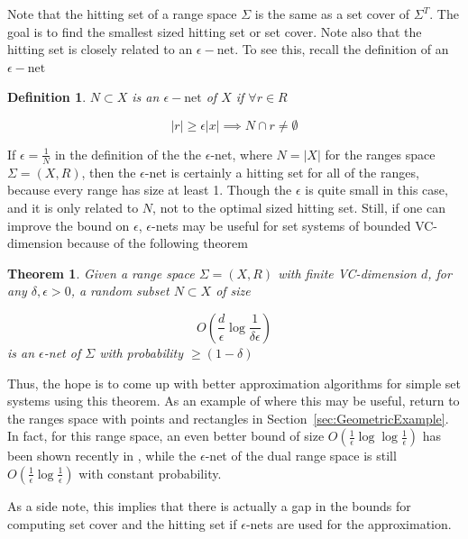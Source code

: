 \documentclass[11pt]{article}
\newtheorem{definition}{Definition}
\newtheorem{theorem}{Theorem}
\begin{document}
Note that the hitting set of a range space $\Sigma$ is the same as a set cover of $\Sigma^T$.  The goal is to find the smallest sized hitting set or set cover.  Note also that the hitting set is closely related to an $\epsilon-\text{net}$.  To see this, recall the definition of an $\epsilon-\text{net}$

\begin{definition}

$N \subset X$ is an {\em $\epsilon - \text{net}$} of $X$ if $\forall r \in R$ 

\[ |r| \geq \epsilon |x| \implies N \cap r \neq \emptyset \]

\end{definition}

If $\epsilon = \frac{1}{N}$ in the definition of the the $\epsilon$-net, where $N = |X|$ for the ranges space $\Sigma = (X, R)$, then the $\epsilon$-net is certainly a hitting set for all of the ranges, because every range has size at least 1.  Though the $\epsilon$ is quite small in this case, and it is only related to $N$, not to the optimal sized hitting set.  Still, if one can improve the bound on $\epsilon$, $\epsilon$-nets may be useful for set systems of bounded VC-dimension because of the following theorem

\begin{theorem}
\label{theorem:epsnettheorem}
	Given a range space $\Sigma = (X, R)$ with finite VC-dimension $d$, for any $\delta, \epsilon > 0$, a random subset $N \subset X$ of size 
	
\[ O\left( \frac{d}{\epsilon} \log \frac{1}{\delta \epsilon} \right) \]
 is an $\epsilon$-net of $\Sigma$ with probability $\geq (1 - \delta)$
 \cite{har2011geometric}
\end{theorem}

Thus, the hope is to come up with better approximation algorithms for simple set systems using this theorem.  As an example of where this may be useful, return to the ranges space with points and rectangles in Section~\ref{sec:GeometricExample}.  In fact, for this range space, an even better bound of size $O(\frac{1}{\epsilon} \log \log \frac{1}{\epsilon} )$ has been shown recently in \cite{aronov2010small}, while the $\epsilon$-net of the dual range space is still $O(\frac{1}{\epsilon} \log \frac{1}{\epsilon} )$ with constant probability.

As a side note, this implies that there is actually a gap in the bounds for computing set cover and the hitting set if $\epsilon$-nets are used for the approximation.
\end{document}
